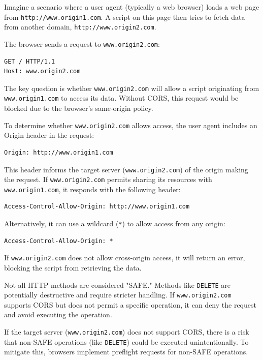 Imagine a scenario where a user agent (typically a web browser) loads a web page from \texttt{http://www.origin1.com}. A script on this page then tries to fetch data from another domain, \texttt{http://www.origin2.com}.

The browser sends a request to \texttt{www.origin2.com}:
\begin{verbatim}
GET / HTTP/1.1
Host: www.origin2.com    
\end{verbatim}
The key question is whether \texttt{www.origin2.com} will allow a script originating from \texttt{www.origin1.com} to access its data. Without CORS, this request would be blocked due to the browser's same-origin policy.

To determine whether \texttt{www.origin2.com} allows access, the user agent includes an Origin header in the request:

\begin{verbatim}
Origin: http://www.origin1.com    
\end{verbatim}
This header informs the target server (\texttt{www.origin2.com}) of the origin making the request. If \texttt{www.origin2.com} permits sharing its resources with \texttt{www.origin1.com}, it responds with the following header:
\begin{verbatim}
Access-Control-Allow-Origin: http://www.origin1.com    
\end{verbatim}
Alternatively, it can use a wildcard (\texttt{*}) to allow access from any origin:
\begin{verbatim}
Access-Control-Allow-Origin: *    
\end{verbatim}
If \texttt{www.origin2.com} does not allow cross-origin access, it will return an error, blocking the script from retrieving the data.

Not all HTTP methods are considered "SAFE." Methods like \texttt{DELETE} are potentially destructive and require stricter handling. If \texttt{www.origin2.com} supports CORS but does not permit a specific operation, it can deny the request and avoid executing the operation.

If the target server (\texttt{www.origin2.com}) does not support CORS, there is a risk that non-SAFE operations (like \texttt{DELETE}) could be executed unintentionally. To mitigate this, browsers implement preflight requests for non-SAFE operations.


